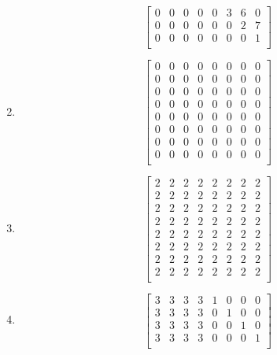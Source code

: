 \documentclass{article}
\theoremstyle{remark}
\begin{document}
\begin{enumerate}
\begin{displaymath}
\begin{bmatrix}
      0 & 0 & 0 & 0 & 0 & 3 & 6 & 0 \\
      0 & 0 & 0 & 0 & 0 & 0 & 2 & 7 \\
      0 & 0 & 0 & 0 & 0 & 0 & 0 & 1 \\
    \end{bmatrix}
  \end{displaymath}
\item
  \begin{displaymath}
    \begin{bmatrix}
      0 & 0 & 0 & 0 & 0 & 0 & 0 & 0 \\
      0 & 0 & 0 & 0 & 0 & 0 & 0 & 0 \\
      0 & 0 & 0 & 0 & 0 & 0 & 0 & 0 \\
      0 & 0 & 0 & 0 & 0 & 0 & 0 & 0 \\
      0 & 0 & 0 & 0 & 0 & 0 & 0 & 0 \\
      0 & 0 & 0 & 0 & 0 & 0 & 0 & 0 \\
      0 & 0 & 0 & 0 & 0 & 0 & 0 & 0 \\
      0 & 0 & 0 & 0 & 0 & 0 & 0 & 0 \\
    \end{bmatrix}
  \end{displaymath}
\item
  \begin{displaymath}
    \begin{bmatrix}
      2 & 2 & 2 & 2 & 2 & 2 & 2 & 2 \\
      2 & 2 & 2 & 2 & 2 & 2 & 2 & 2 \\
      2 & 2 & 2 & 2 & 2 & 2 & 2 & 2 \\
      2 & 2 & 2 & 2 & 2 & 2 & 2 & 2 \\
      2 & 2 & 2 & 2 & 2 & 2 & 2 & 2 \\
      2 & 2 & 2 & 2 & 2 & 2 & 2 & 2 \\
      2 & 2 & 2 & 2 & 2 & 2 & 2 & 2 \\
      2 & 2 & 2 & 2 & 2 & 2 & 2 & 2 \\
    \end{bmatrix}
  \end{displaymath}
\item
  \begin{displaymath}
    \begin{bmatrix}
      3 & 3 & 3 & 3 & 1 & 0 & 0 & 0 \\
      3 & 3 & 3 & 3 & 0 & 1 & 0 & 0\\
      3 & 3 & 3 & 3 & 0 & 0 & 1 & 0\\
      3 & 3 & 3 & 3 & 0 & 0 & 0 & 1 \\

\end{bmatrix}
\end{displaymath}
\end{enumerate}
\end{document}
